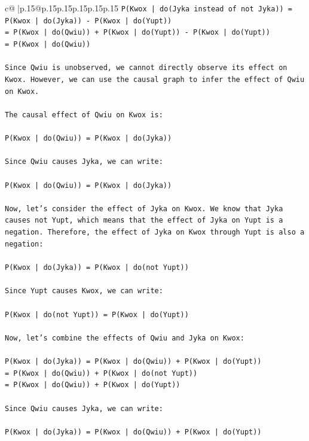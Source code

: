 \documentclass{article}
\begin{document}
{\begin{supertabular}{c@{$\;$}|p{.15\linewidth}@{}p{.15\linewidth}p{.15\linewidth}p{.15\linewidth}p{.15\linewidth}p{.15\linewidth}}
{{{\texttt{P(Kwox | do(Jyka instead of not Jyka)) = P(Kwox | do(Jyka)) {-} P(Kwox | do(Yupt))} \\
\texttt{= P(Kwox | do(Qwiu)) + P(Kwox | do(Yupt)) {-} P(Kwox | do(Yupt))} \\
\texttt{= P(Kwox | do(Qwiu))} \\
\\ 
\texttt{Since Qwiu is unobserved, we cannot directly observe its effect on Kwox. However, we can use the causal graph to infer the effect of Qwiu on Kwox.} \\
\\ 
\texttt{The causal effect of Qwiu on Kwox is:} \\
\\ 
\texttt{P(Kwox | do(Qwiu)) = P(Kwox | do(Jyka))} \\
\\ 
\texttt{Since Qwiu causes Jyka, we can write:} \\
\\ 
\texttt{P(Kwox | do(Qwiu)) = P(Kwox | do(Jyka))} \\
\\ 
\texttt{Now, let's consider the effect of Jyka on Kwox. We know that Jyka causes not Yupt, which means that the effect of Jyka on Yupt is a negation. Therefore, the effect of Jyka on Kwox through Yupt is also a negation:} \\
\\ 
\texttt{P(Kwox | do(Jyka)) = P(Kwox | do(not Yupt))} \\
\\ 
\texttt{Since Yupt causes Kwox, we can write:} \\
\\ 
\texttt{P(Kwox | do(not Yupt)) = P(Kwox | do(Yupt))} \\
\\ 
\texttt{Now, let's combine the effects of Qwiu and Jyka on Kwox:} \\
\\ 
\texttt{P(Kwox | do(Jyka)) = P(Kwox | do(Qwiu)) + P(Kwox | do(Yupt))} \\
\texttt{= P(Kwox | do(Qwiu)) + P(Kwox | do(not Yupt))} \\
\texttt{= P(Kwox | do(Qwiu)) + P(Kwox | do(Yupt))} \\
\\ 
\texttt{Since Qwiu causes Jyka, we can write:} \\
\\ 
\texttt{P(Kwox | do(Jyka)) = P(Kwox | do(Qwiu)) + P(Kwox | do(Yupt))} \\
}}}
\end{supertabular}}
\end{document}
